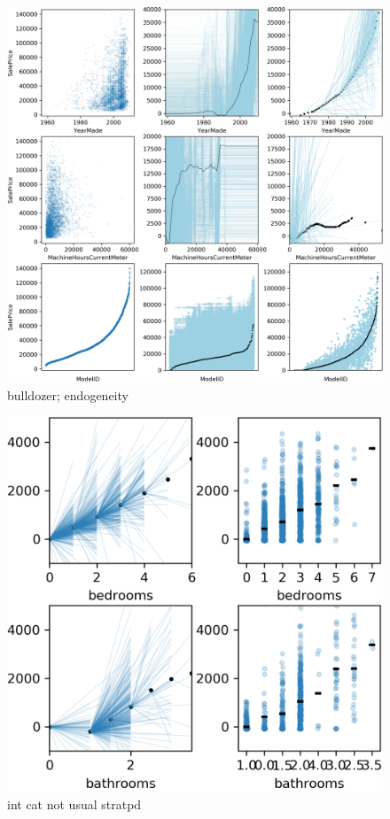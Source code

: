 \documentclass[12pt]{article}
\begin{document}
\begin{figure}[htbp]
\begin{center}
\includegraphics[scale=0.7]{images/bulldozer.png}
\caption{bulldozer; endogeneity}
\label{fig:bulldozer}
\end{center}
\end{figure}

\begin{figure}[htbp]
\begin{center}
\includegraphics[scale=0.7]{images/rent_intcat.png}
\caption{int cat not usual stratpd}
\label{fig:rent_intcat}
\end{center}
\end{figure}
\end{document}
